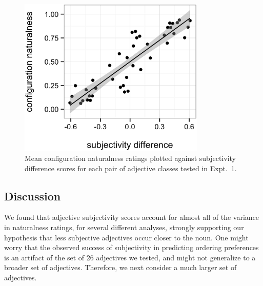 \documentclass[12pt]{article}
\begin{document}
\begin{figure}
	\centering\includegraphics[width=3.5in]{plots/naturalness-subjectivity-configuration.eps}
	\caption{Mean configuration naturalness ratings plotted against subjectivity difference scores for each pair of adjective classes tested in Expt.~1.}\label{naturalness-subjectivity}
\end{figure}


\subsection{Discussion}

We found that adjective subjectivity scores account for almost all of the variance in naturalness ratings, for several different analyses, strongly supporting our hypothesis that less subjective adjectives occur closer to the noun. One might worry that the observed success of subjectivity in predicting ordering preferences is an artifact of the set of 26 adjectives we %
tested, and might not generalize to a broader set of adjectives. Therefore, we next consider a much larger set of adjectives. 
\end{document}
